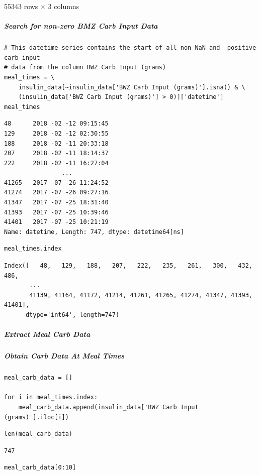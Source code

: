 \bigskip

55343 rows $\times$ 3 columns

\subparagraph{Search for non-zero BMZ Carb Input Data}

\begin{verbatim}
# This datetime series contains the start of all non NaN and  positive carb input
# data from the column BWZ Carb Input (grams)
meal_times = \
    insulin_data[~insulin_data['BWZ Carb Input (grams)'].isna() & \
    (insulin_data['BWZ Carb Input (grams)'] > 0)]['datetime']
meal_times
\end{verbatim}

\begin{verbatim}
48      2018 -02 -12 09:15:45
129     2018 -02 -12 02:30:55
188     2018 -02 -11 20:33:18
207     2018 -02 -11 18:14:37
222     2018 -02 -11 16:27:04
                ...        
41265   2017 -07 -26 11:24:52
41274   2017 -07 -26 09:27:16
41347   2017 -07 -25 18:31:40
41393   2017 -07 -25 10:39:46
41401   2017 -07 -25 10:21:19
Name: datetime, Length: 747, dtype: datetime64[ns]
\end{verbatim}

\begin{verbatim}
meal_times.index
\end{verbatim}

\begin{verbatim}
Index([   48,   129,   188,   207,   222,   235,   261,   300,   432,   486,
       ...
       41139, 41164, 41172, 41214, 41261, 41265, 41274, 41347, 41393, 41401],
      dtype='int64', length=747)
\end{verbatim}

\subparagraph{Extract Meal Carb Data}

\subparagraph{Obtain Carb Data At Meal Times}

\begin{verbatim}
meal_carb_data = []

for i in meal_times.index:
    meal_carb_data.append(insulin_data['BWZ Carb Input (grams)'].iloc[i])
\end{verbatim}

\begin{verbatim}
len(meal_carb_data)
\end{verbatim}

\begin{verbatim}
747
\end{verbatim}

\begin{verbatim}
meal_carb_data[0:10]
\end{verbatim}

